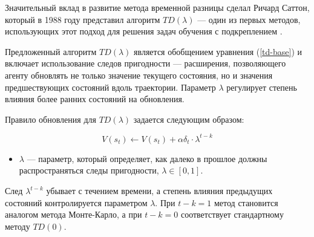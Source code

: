 Значительный вклад в развитие метода временной разницы сделал Ричард Саттон, который в 1988 году представил алгоритм $TD(\lambda)$ — один из первых методов, использующих этот подход для решения задач обучения с подкреплением \cite{td-first-improvement}.

Предложенный алгоритм $TD(\lambda)$ является обобщением уравнения (\ref{td-base}) и включает использование следов пригодности — расширения, позволяющего агенту обновлять не только значение текущего состояния, но и значения предшествующих состояний вдоль траектории. Параметр $\lambda$ регулирует степень влияния более ранних состояний на обновления.

Правило обновления для $TD(\lambda)$ задается следующим образом:

\begin{equation}\label{td-lambda}
    V(s_t) \leftarrow V(s_t) + \alpha \delta_t \cdot \lambda^{t - k}
\end{equation}

\begin{itemize}
    \item $\lambda$ --- параметр, который определяет, как далеко в прошлое должны распространяться следы пригодности, $\lambda \in [0, 1]$.
\end{itemize}

След $\lambda^{t-k}$ убывает с течением времени, а степень влияния предыдущих состояний контролируется параметром $\lambda$. При $t-k = 1$ метод становится аналогом метода Монте-Карло, а при $t-k = 0$ соответствует стандартному методу $TD(0)$.
